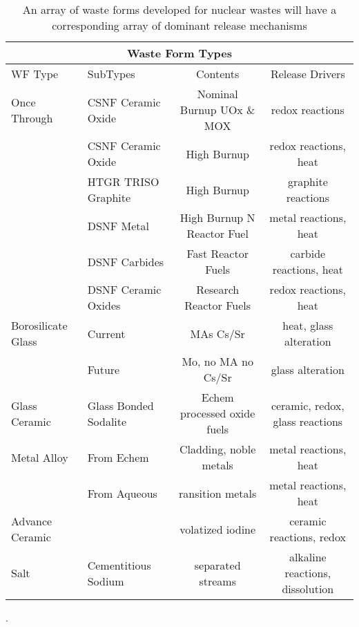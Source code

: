 %
\begin{table}[h!]
  \centering
  \footnotesize{
  \begin{tabular}{|l|l|c|c|}
    \multicolumn{4}{c}{\textbf{Waste Form Types}}\\
    \hline
    WF Type & SubTypes & Contents & Release Drivers  \\
    \hline
    \hline
    Once Through & \gls{CSNF} Ceramic Oxide & Nominal Burnup UOx \& MOX & redox reactions \\
                 & \gls{CSNF} Ceramic Oxide & High Burnup  & redox reactions, heat  \\
                 & \gls{HTGR} TRISO Graphite & High Burnup & graphite reactions\\
                 & \gls{DSNF} Metal  & High Burnup N Reactor Fuel & metal reactions,  heat\\
                 & \gls{DSNF} Carbides  & Fast Reactor Fuels & carbide reactions,  heat\\
                 & \gls{DSNF} Ceramic Oxides  & Research Reactor Fuels & redox reactions,  heat\\
    \hline
    Borosilicate Glass & Current & \glspl{MA} Cs/Sr & heat, glass alteration \\
                       & Future & Mo, no \gls{MA} no Cs/Sr & glass alteration  \\
    \hline
    Glass Ceramic & Glass Bonded Sodalite & Echem processed oxide fuels & ceramic, redox, glass reactions  \\
    \hline
    Metal Alloy & From Echem & Cladding, noble metals & metal reactions, heat \\
                & From Aqueous & ransition metals & metal reactions, heat  \\
    \hline
    Advance Ceramic &  & volatized iodine  & ceramic reactions, redox \\
    \hline
    Salt  & Cementitious Sodium  & separated streams  & alkaline reactions, dissolution \\
    \hline
  \end{tabular}
  \caption[Waste Form Types]{An array of waste forms developed for nuclear 
  wastes will have a corresponding array of dominant release mechanisms \cite{blink_disposal_2010}}.
  \label{tab:wf}
  }
\end{table}


